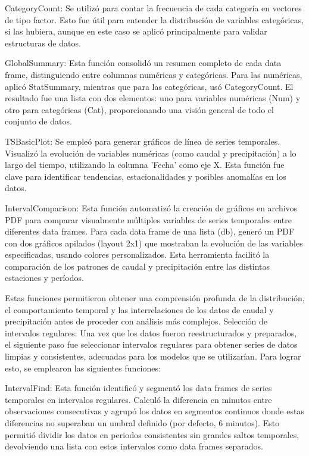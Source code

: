 \documentclass[hess, manuscript]{copernicus}
\begin{document}
CategoryCount: Se utilizó para contar la frecuencia de cada categoría en vectores de tipo factor. Esto fue útil para entender la distribución de variables categóricas, si las hubiera, aunque en este caso se aplicó principalmente para validar estructuras de datos.

GlobalSummary: Esta función consolidó un resumen completo de cada data frame, distinguiendo entre columnas numéricas y categóricas. Para las numéricas, aplicó StatSummary, mientras que para las categóricas, usó CategoryCount. El resultado fue una lista con dos elementos: uno para variables numéricas (Num) y otro para categóricas (Cat), proporcionando una visión general de todo el conjunto de datos.

TSBasicPlot: Se empleó para generar gráficos de línea de series temporales. Visualizó la evolución de variables numéricas (como caudal y precipitación) a lo largo del tiempo, utilizando la columna 'Fecha' como eje X. Esta función fue clave para identificar tendencias, estacionalidades y posibles anomalías en los datos.

IntervalComparison: Esta función automatizó la creación de gráficos en archivos PDF para comparar visualmente múltiples variables de series temporales entre diferentes data frames. Para cada data frame de una lista (db), generó un PDF con dos gráficos apilados (layout 2x1) que mostraban la evolución de las variables especificadas, usando colores personalizados. Esta herramienta facilitó la comparación de los patrones de caudal y precipitación entre las distintas estaciones y períodos.

Estas funciones permitieron obtener una comprensión profunda de la distribución, el comportamiento temporal y las interrelaciones de los datos de caudal y precipitación antes de proceder con análisis más complejos.
Selección de intervalos regulares:
Una vez que los datos fueron reestructurados y preparados, el siguiente paso fue seleccionar intervalos regulares para obtener series de datos limpias y consistentes, adecuadas para los modelos que se utilizarían. Para lograr esto, se emplearon las siguientes funciones:

IntervalFind: Esta función identificó y segmentó los data frames de series temporales en intervalos regulares. Calculó la diferencia en minutos entre observaciones consecutivas y agrupó los datos en segmentos continuos donde estas diferencias no superaban un umbral definido (por defecto, 6 minutos). Esto permitió dividir los datos en periodos consistentes sin grandes saltos temporales, devolviendo una lista con estos intervalos como data frames separados.
\end{document}
